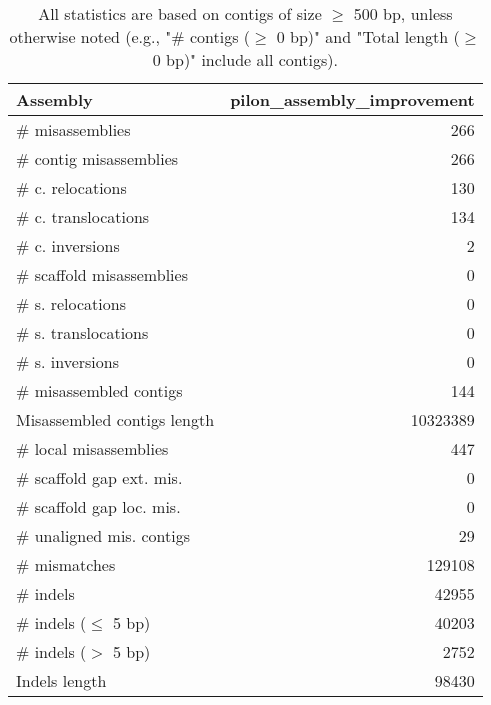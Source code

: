 \documentclass[12pt,a4paper]{article}
\begin{document}
\begin{table}[ht]
\begin{center}
\caption{All statistics are based on contigs of size $\geq$ 500 bp, unless otherwise noted (e.g., "\# contigs ($\geq$ 0 bp)" and "Total length ($\geq$ 0 bp)" include all contigs).}
\begin{tabular}{|l*{1}{|r}|}
\hline
Assembly & pilon\_assembly\_improvement \\ \hline
\# misassemblies & 266 \\ \hline
\hspace{2mm}\# contig misassemblies & 266 \\ \hline
\hspace{5mm}\# c. relocations & 130 \\ \hline
\hspace{5mm}\# c. translocations & 134 \\ \hline
\hspace{5mm}\# c. inversions & 2 \\ \hline
\hspace{2mm}\# scaffold misassemblies & 0 \\ \hline
\hspace{5mm}\# s. relocations & 0 \\ \hline
\hspace{5mm}\# s. translocations & 0 \\ \hline
\hspace{5mm}\# s. inversions & 0 \\ \hline
\# misassembled contigs & 144 \\ \hline
Misassembled contigs length & 10323389 \\ \hline
\# local misassemblies & 447 \\ \hline
\# scaffold gap ext. mis. & 0 \\ \hline
\# scaffold gap loc. mis. & 0 \\ \hline
\# unaligned mis. contigs & 29 \\ \hline
\# mismatches & 129108 \\ \hline
\# indels & 42955 \\ \hline
\hspace{5mm}\# indels ($\leq$ 5 bp) & 40203 \\ \hline
\hspace{5mm}\# indels ($>$ 5 bp) & 2752 \\ \hline
Indels length & 98430 \\ \hline
\end{tabular}
\end{center}
\end{table}
\end{document}
